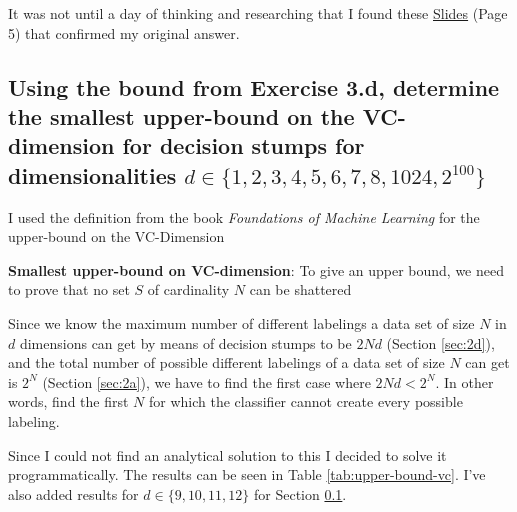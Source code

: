 \documentclass[11pt,a4paper]{article}
\begin{document}
It was not until a day of thinking and researching that I found these \href{https://people.csail.mit.edu/alinush/6.867-fall-2013/2013.10.22.w8.tu-lecture-13-generalization-part-2.pdf}{Slides} (Page 5) that confirmed my original answer.

\subsection{Using the bound from Exercise 3.d, determine the smallest upper-bound on the VC-dimension for decision stumps for dimensionalities $d ∈ \{1, 2, 3, 4, 5, 6, 7, 8, 1024, 2^{100}\}$}
\label{sec:2e}
I used the definition from the book \textit{Foundations of Machine Learning} \cite{foundations_of_machine_learning} for the upper-bound on the VC-Dimension

\textbf{Smallest upper-bound on VC-dimension}: To give an upper bound, we need to prove that no set $S$ of cardinality $N$ can be shattered

Since we know the maximum number of different labelings a data set of size $N$ in $d$ dimensions can get by means of decision stumps to be $2Nd$ (Section \ref{sec:2d}), and the total number of possible different labelings of a data set of size $N$ can get is $2^N$ (Section \ref{sec:2a}), we have to find the first case where $2Nd < 2^N$. In other words, find the first $N$ for which the classifier cannot create every possible labeling.

Since I could not find an analytical solution to this I decided to solve it programmatically. The results can be seen in Table \ref{tab:upper-bound-vc}. I've also added results for $d \in \{9, 10, 11, 12\}$ for Section \ref{sec:2e}.
\end{document}
